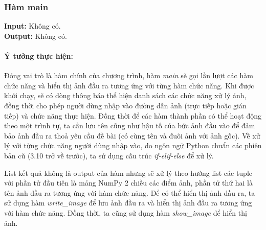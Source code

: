 \documentclass[]{article}
\begin{document}
\subsubsection{Hàm main}
\textbf{Input:} Không có. \\
\textbf{Output:} Không có.
\paragraph{Ý tưởng thực hiện:} Đóng vai trò là hàm chính của chương trình, hàm \textit{main} sẽ gọi lần lượt các hàm chức năng và hiển thị ảnh đầu ra tương ứng với từng hàm chức năng. Khi được khởi chạy, sẽ có dòng thông báo thể hiện danh sách các chức năng xử lý ảnh, đồng thời cho phép người dùng nhập vào đường dẫn ảnh (trực tiếp hoặc gián tiếp) và chức năng thực hiện. Đồng thời để các hàm thành phần có thể hoạt động theo một trình tự, ta cần lưu tên cũng như hậu tố của bức ảnh đầu vào để đảm bảo ảnh đầu ra thoả yêu cầu đề bài (có cùng tên và đuôi ảnh với ảnh gốc). Về xử lý với từng chức năng người dùng nhập vào, do ngôn ngữ Python chuẩn các phiên bản cũ (3.10 trở về trước), ta sử dụng cấu trúc \textit{if-elif-else} để xử lý. \par
List kết quả không là output của hàm nhưng sẽ xử lý theo hướng list các tuple với phần tử đầu tiên là mảng NumPy 2 chiều các điểm ảnh, phần tử thứ hai là tên ảnh đầu ra tương ứng với hàm chức năng. Để có thể hiển thị ảnh đầu ra, ta sử dụng hàm \textit{write\_image} để lưu ảnh đầu ra và hiển thị ảnh đầu ra tương ứng với hàm chức năng. Đồng thời, ta cũng sử dụng hàm \textit{show\_image} để hiển thị ảnh. \par
\end{document}
